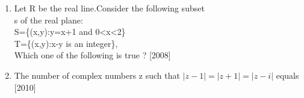 \documentclass[journal,12pt,twocolumn,article]{IEEEtran}
\theoremstyle{remark}
\begin{document}
\begin{enumerate}[start = 14]
\begin{multicols}{4}
\begin{enumerate}
\item $\frac{1}{i+1}$
\item $\frac{-1}{i+1}$
\item $\frac{1}{i-1}$
\end{enumerate}
\end{multicols}
\item Let R be the real line.Consider the following
subset \\s of the real plane: \\S=\{(x,y):y=x+1 and 0{\textless}x{\textless}2\} \\ T=\{(x,y):x-y is an integer\}, \\Which one of the following is true ?
\hfill{[2008]}
\begin{enumerate}
\end{enumerate}

\item The number of complex numbers z such that $|z-1|=|z+1|=|z-i|$ equals
\hfill{[2010]}

\begin{enumerate}
\end{enumerate}


\end{enumerate}
\end{document}
